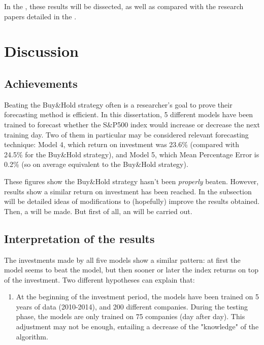 \documentclass[11pt]{article}
\begin{document}
\begin{onehalfspace}
In the , these results will be dissected, as well as compared with the research papers detailed in the .

\pagebreak

\section{Discussion}
\label{discuss}

\subsection{Achievements}
Beating the Buy\&Hold strategy often is a researcher's goal to prove their forecasting method is efficient. In this dissertation, 5 different models have been trained to forecast whether the S\&P500 index would increase or decrease the next training day. Two of them in particular may be considered relevant forecasting technique: Model 4, which return on investment was 23.6\% (compared with 24.5\% for the Buy\&Hold strategy), and Model 5, which Mean Percentage Error is 0.2\% (so on average equivalent to the Buy\&Hold strategy). 

These figures show the Buy\&Hold strategy hasn't been \emph{properly} beaten. However, results show a similar return on investment has been reached. In the subsection  will be detailed ideas of modifications to (hopefully) improve the results obtained. Then, a  will be made. But first of all, an  will be carried out.

\subsection{Interpretation of the results}
\label{sec:interpret}

The investments made by all five models show a similar pattern: at first the model seems to beat the model, but then sooner or later the index returns on top of the investment. Two different hypotheses can explain that:

\begin{enumerate}
    \item At the beginning of the investment period, the models have been trained on 5 years of data (2010-2014), and 200 different companies. During the testing phase, the models are only trained on 75 companies (day after day). This adjustment may not be enough, entailing a decrease of the "knowledge" of the algorithm. 
    

\end{enumerate}
\end{onehalfspace}
\end{document}
